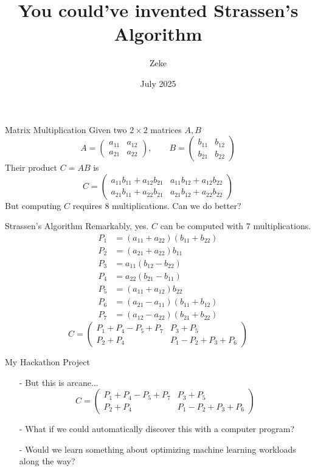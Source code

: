 \documentclass{beamer}
\title{You could've invented Strassen's Algorithm}
\author{Zeke}
\date{July 2025}
\begin{document}
\maketitle

\begin{frame}{Matrix Multiplication}
    Given two $2\times 2$ matrices $A,B$
    \[
    A=\begin{pmatrix}
    a_{11} & a_{12}\\
    a_{21} & a_{22}
    \end{pmatrix},\qquad
    B=\begin{pmatrix}
    b_{11} & b_{12}\\
    b_{21} & b_{22}
    \end{pmatrix}
    \]
    \pause Their product $C=AB$ is
    \[
    C = \begin{pmatrix}
    a_{11}b_{11}+a_{12}b_{21} & a_{11}b_{12}+a_{12}b_{22}\\
    a_{21}b_{11}+a_{22}b_{21} & a_{21}b_{12}+a_{22}b_{22}
    \end{pmatrix}
    \]
    \pause But computing $C$ requires $8$ multiplications. Can we do better?
\end{frame}

\begin{frame}{Strassen's Algorithm}
    Remarkably, yes. $C$ can be computed with $7$ multiplications.
    \begin{align*}
    P_1 &= (a_{11}+a_{22})(b_{11}+b_{22})\\
    P_2 &= (a_{21}+a_{22}) b_{11}\\
    P_3 &= a_{11} (b_{12}-b_{22})\\
    P_4 &= a_{22} (b_{21}-b_{11})\\
    P_5 &= (a_{11}+a_{12}) b_{22}\\
    P_6 &= (a_{21}-a_{11})(b_{11}+b_{12})\\
    P_7 &= (a_{12}-a_{22})(b_{21}+b_{22})
    \end{align*}
    \[
    C =
    \begin{pmatrix}
    P_1 + P_4 - P_5 + P_7 & P_3 + P_5\\
    P_2 + P_4 & P_1 - P_2 + P_3 + P_6
    \end{pmatrix}
    \]
\end{frame}

\begin{frame}{My Hackathon Project}
\begin{enumerate}
    \item[-] But this is arcane...
        \[
        C =
        \begin{pmatrix}
        P_1 + P_4 - P_5 + P_7 & P_3 + P_5\\
        P_2 + P_4 & P_1 - P_2 + P_3 + P_6
        \end{pmatrix}
        \]
    \item[-] \pause What if we could automatically discover this with a computer program?
    \item[-] \pause Would we learn something about optimizing machine learning workloads along the way?
\end{enumerate}
\end{frame}
\end{document}
